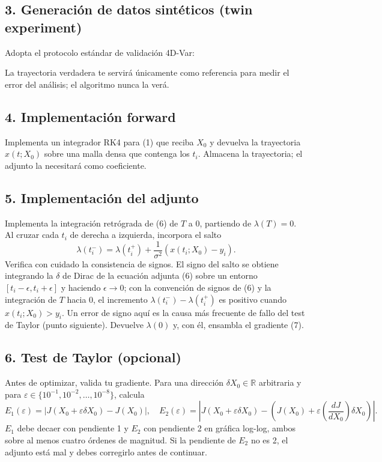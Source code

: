 \documentclass[12pt,spanish,mexico]{article}
\numberwithin{equation}{section}
\theoremstyle{definition}
\theoremstyle{remark}
\begin{document}
\subsection{3. Generación de datos sintéticos (twin experiment)}
Adopta el protocolo estándar de validación 4D-Var:
La trayectoria verdadera te servirá únicamente como referencia para medir el error del análisis; el algoritmo nunca la verá.

\subsection{4. Implementación forward}
Implementa un integrador RK4 para (1) que reciba \(X_0\) y devuelva la trayectoria \(x(t; X_0)\) sobre una malla densa que contenga los \(t_i\). Almacena la trayectoria; el adjunto la necesitará como coeficiente.

\subsection{5. Implementación del adjunto}
Implementa la integración retrógrada de (6) de \(T\) a \(0\), partiendo de \(\lambda(T) = 0\). Al cruzar cada \(t_i\) de derecha a izquierda, incorpora el salto
\[
\lambda(t_i^-) = \lambda(t_i^+) + \frac{1}{\sigma^2}(x(t_i; X_0) - y_i).
\]
Verifica con cuidado la consistencia de signos. El signo del salto se obtiene integrando la \(\delta\) de Dirac de la ecuación adjunta (6) sobre un entorno \([t_i-\epsilon, t_i+\epsilon]\) y haciendo \(\epsilon \to 0\); con la convención de signos de (6) y la integración de \(T\) hacia \(0\), el incremento \(\lambda(t_i^-) - \lambda(t_i^+)\) es positivo cuando \(x(t_i; X_0) > y_i\). Un error de signo aquí es la causa más frecuente de fallo del test de Taylor (punto siguiente). Devuelve \(\lambda(0)\) y, con él, ensambla el gradiente (7).

\subsection{6. Test de Taylor (opcional)}
Antes de optimizar, valida tu gradiente. Para una dirección \(\delta X_0 \in \mathbb{R}\) arbitraria y para \(\varepsilon \in \{10^{-1}, 10^{-2}, \dots, 10^{-8}\}\), calcula
\[
E_1(\varepsilon) = |J(X_0 + \varepsilon \delta X_0) - J(X_0)|, \quad E_2(\varepsilon) = |J(X_0 + \varepsilon \delta X_0) - (J(X_0) + \varepsilon \left(\frac{dJ}{dX_0}\right) \delta X_0)|.
\]
\(E_1\) debe decaer con pendiente 1 y \(E_2\) con pendiente 2 en gráfica log-log, ambos sobre al menos cuatro órdenes de magnitud. Si la pendiente de \(E_2\) no es 2, el adjunto está mal y debes corregirlo antes de continuar.
\end{document}
